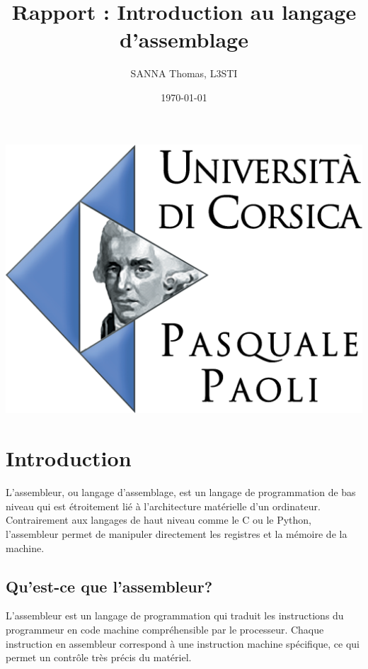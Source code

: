 \documentclass[a4paper, 12pt]{report}
\title{Rapport : Introduction au langage d'assemblage}
\author{SANNA Thomas, L3STI}
\date{\today}
\begin{document}
\maketitle

\break

\newpage
\thispagestyle{empty}
\vspace*{\fill}
\begin{center}
  \includegraphics[width=1\textwidth]{imgs/logouniv.jpg}
\end{center}
\vspace*{\fill}


\tableofcontents

\chapter{Introduction}
L'assembleur, ou langage d'assemblage, est un langage de programmation de bas niveau qui est étroitement lié à l'architecture matérielle d'un ordinateur. Contrairement aux langages de haut niveau comme le C ou le Python, l'assembleur permet de manipuler directement les registres et la mémoire de la machine.

\section{Qu'est-ce que l'assembleur?}
L'assembleur est un langage de programmation qui traduit les instructions du programmeur en code machine compréhensible par le processeur. Chaque instruction en assembleur correspond à une instruction machine spécifique, ce qui permet un contrôle très précis du matériel.
\end{document}
